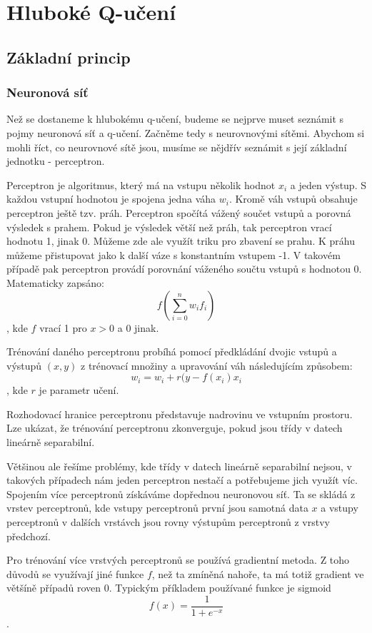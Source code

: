 \chapter{Hluboké Q-učení}

\section{Základní princip}
\subsection{Neuronová síť}
Než se dostaneme k hlubokému q-učení, budeme se nejprve muset seznámit s pojmy neuronová síť a q-učení. Začněme tedy s neurovnovými sítěmi.
Abychom si mohli říct, co neurovnové sítě jsou, musíme se nějdřív seznámit s její základní jednotku - perceptron.
\par
Perceptron je algoritmus, který má na vstupu několik hodnot $x_i$ a jeden výstup. S každou vstupní hodnotou je spojena jedna váha $w_i$.
Kromě váh vstupů obsahuje perceptron ještě tzv. práh. Perceptron spočítá vážený součet vstupů a porovná výsledek s prahem. Pokud je výsledek větší než práh, tak perceptron vrací hodnotu 1, jinak 0.
Můžeme zde ale využít triku pro zbavení se prahu. K práhu můžeme přistupovat jako k další váze s konstantním vstupem -1.
V takovém případě pak perceptron provádí porovnání váženého součtu vstupů s hodnotou 0. 
\newline
Matematicky zapsáno:
\[f(\sum_{i=0}^{n} w_if_i)\], kde $f$ vrací 1 pro $x>0$ a 0 jinak.

Trénování daného perceptronu probíhá pomocí předkládání dvojic vstupů a výstupů $(x,y)$ z trénovací množiny a upravování váh následujícím způsobem:
\newline
\[w_i = w_i + r(y-f(x_i)x_i\], kde $r$ je parametr učení.

Rozhodovací hranice perceptronu představuje nadrovinu ve vstupním prostoru. Lze ukázat, že trénování perceptronu zkonverguje, pokud jsou třídy v datech lineárně separabilní.

Většinou ale řešíme problémy, kde třídy v datech lineárně separabilní nejsou, v takových případech nám jeden perceptron nestačí a potřebujeme jich využít víc.
Spojením více perceptronů získáváme dopřednou neuronovou síť. Ta se skládá z vrstev perceptronů, kde vstupy perceptronů první jsou samotná data $x$ a vstupy perceptronů v dalších vrstávch jsou rovny výstupům perceptronů z vrstvy předchozí.

Pro trénování více vrstvých perceptronů se používá gradientní metoda. Z toho důvodů se využívají jiné funkce $f$, než ta zmíněná nahoře, ta má totiž gradient ve většíně případů roven 0.
Typickým příkladem používané funkce je sigmoid \[f(x) = \frac{1}{1+e^{-x}}\].

